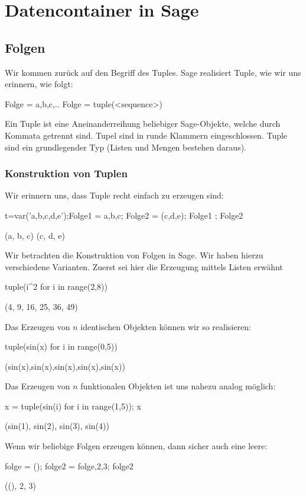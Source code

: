 \documentclass[fontsize=12pt,paper=a4,twoside,bibtotoc,idxtotoc,
liststotoc,pagesize,BCOR1.2cm,DIV15,chapterprefix,pagesize=pdftex]{scrbook}
\theoremstyle{plain}
\theoremstyle{definition}
\theoremstyle{remark}
\begin{document}
\section{Datencontainer in Sage}
\subsection{Folgen}
Wir kommen zurück auf den Begriff des Tuples. Sage realisiert Tuple, wie wir uns erinnern, wie folgt:
\begin{sagein}
 Folge = a,b,c,..
 Folge = tuple(<sequence>)
\end{sagein}
Ein Tuple ist eine Aneinanderreihung beliebiger Sage-Objekte, welche durch Kommata getrennt sind. Tupel sind in  runde Klammern eingeschlossen. Tuple sind ein 
grundlegender Typ (Listen und Mengen bestehen daraus). 
\subsubsection{Konstruktion von Tuplen}
Wir erinnern uns, dass Tuple recht einfach zu erzeugen sind:
\begin{sagein}
t=var('a,b,c,d,e');Folge1 = a,b,c; Folge2 = (c,d,e); Folge1 ; Folge2
\end{sagein}
\begin{sage}
(a, b, c)
(c, d, e)
\end{sage}
 Wir betrachten die Konstruktion von Folgen in Sage. Wir haben hierzu verschiedene Varianten. Zuerst sei hier die Erzeugung mittels Listen erwähnt
\begin{sagein}
tuple(i^2 for i in range(2,8))
\end{sagein}
\begin{sage}
(4, 9, 16, 25, 36, 49)
\end{sage}
Das Erzeugen von $n$ identischen Objekten können wir so realisieren:
\begin{sagein}
tuple(sin(x) for i in range(0,5))
\end{sagein}
\begin{sage}
  (sin(x),sin(x),sin(x),sin(x),sin(x))
\end{sage}
Das Erzeugen von $n$ funktionalen Objekten ist uns nahezu analog möglich:
\begin{sagein}
x = tuple(sin(i) for i in range(1,5)); x
\end{sagein}
\begin{sage}
(sin(1), sin(2), sin(3), sin(4))
\end{sage}  
Wenn wir beliebige Folgen erzeugen können, dann sicher auch eine leere:
\begin{sagein}
folge = (); folge2 = folge,2,3; folge2
\end{sagein}
\begin{sage}
 ((), 2, 3)
\end{sage}
\end{document}
